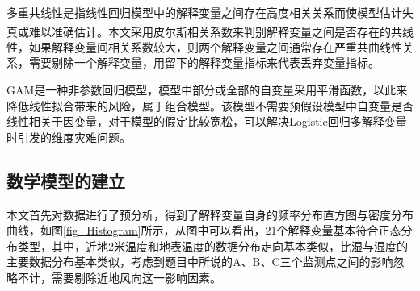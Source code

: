 \documentclass[a4paper,10pt]{my_paper}
\numberwithin{equation}{section}
\begin{document}
多重共线性是指线性回归模型中的解释变量之间存在高度相关关系而使模型估计失真或难以准确估计\textsuperscript{\cite{ref6}}。本文采用皮尔斯相关系数来判别解释变量之间是否存在的共线性，如果解释变量间相关系数较大，则两个解释变量之间通常存在严重共曲线性关系，需要剔除一个解释变量，用留下的解释变量指标来代表丢弃变量指标。

GAM是一种非参数回归模型，模型中部分或全部的自变量采用平滑函数，以此来降低线性拟合带来的风险，属于组合模型。该模型不需要预假设模型中自变量是否线性相关于因变量，对于模型的假定比较宽松，可以解决Logistic回归多解释变量时引发的维度灾难问题。

\subsection{数学模型的建立}
本文首先对数据进行了预分析，得到了解释变量自身的频率分布直方图与密度分布曲线，如图\ref{fig_Histogram}所示，从图中可以看出，21个解释变量基本符合正态分布类型，其中，近地2米温度和地表温度的数据分布走向基本类似，比湿与湿度的主要数据分布基本类似，考虑到题目中所说的A、B、C三个监测点之间的影响忽略不计，需要剔除近地风向这一影响因素。
\end{document}
